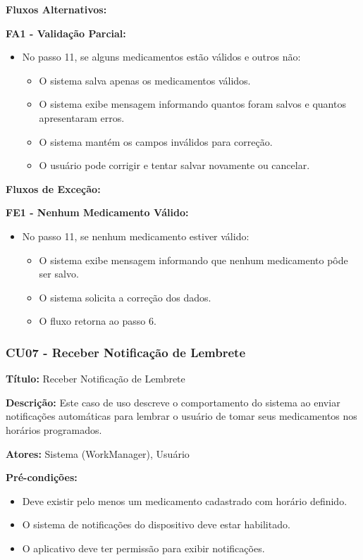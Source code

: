 \documentclass[12pt]{article}
\begin{document}
\textbf{Fluxos Alternativos:}

\textbf{FA1 - Validação Parcial:}
\begin{itemize}
    \item No passo 11, se alguns medicamentos estão válidos e outros não:
    \begin{itemize}
        \item O sistema salva apenas os medicamentos válidos.
        \item O sistema exibe mensagem informando quantos foram salvos e quantos apresentaram erros.
        \item O sistema mantém os campos inválidos para correção.
        \item O usuário pode corrigir e tentar salvar novamente ou cancelar.
    \end{itemize}
\end{itemize}

\textbf{Fluxos de Exceção:}

\textbf{FE1 - Nenhum Medicamento Válido:}
\begin{itemize}
    \item No passo 11, se nenhum medicamento estiver válido:
    \begin{itemize}
        \item O sistema exibe mensagem informando que nenhum medicamento pôde ser salvo.
        \item O sistema solicita a correção dos dados.
        \item O fluxo retorna ao passo 6.
    \end{itemize}
\end{itemize}

\subsubsection{CU07 - Receber Notificação de Lembrete}

\textbf{Título:} Receber Notificação de Lembrete

\textbf{Descrição:} Este caso de uso descreve o comportamento do sistema ao enviar notificações automáticas para lembrar o usuário de tomar seus medicamentos nos horários programados.

\textbf{Atores:} Sistema (WorkManager), Usuário

\textbf{Pré-condições:}
\begin{itemize}
    \item Deve existir pelo menos um medicamento cadastrado com horário definido.
    \item O sistema de notificações do dispositivo deve estar habilitado.
    \item O aplicativo deve ter permissão para exibir notificações.
\end{itemize}
\end{document}
